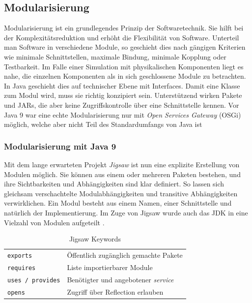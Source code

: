 \documentclass[a4paper,10.2pt,pdftex]{scrartcl}%
\begin{document}
\subsection{Modularisierung}
Modularisierung ist ein grundlegendes Prinzip der Softwaretechnik. Sie hilft bei der Komplexitätsreduktion und erhöht die Flexibilität von Software. Unterteil man Software in verschiedene Module, so geschieht dies nach gängigen Kriterien wie minimale Schnittstellen, maximale Bindung, minimale Kopplung oder Testbarkeit. Im Falle einer Simulation mit physikalischen Komponenten liegt es nahe, die einzelnen Komponenten als in sich geschlossene Module zu betrachten. In Java geschieht dies auf technischer Ebene mit Interfaces. Damit eine Klasse zum Modul wird, muss sie richtig konzipiert sein. Unterstützend wirken Pakete und JARs, die aber keine Zugriffskontrolle über eine Schnittstelle kennen. Vor Java 9 war eine echte Modularisierung nur mit \emph{Open Services Gateway} (OSGi) möglich, welche aber nicht Teil des Standardumfangs von Java ist \cite[S. 32f]{modul}

\subsubsection{Modularisierung mit Java 9} 
Mit dem lange erwarteten Projekt \emph{Jigsaw} ist nun eine explizite Erstellung von Modulen möglich. Sie können aus einem oder mehreren Paketen bestehen, und ihre Sichtbarkeiten und Abhängigkeiten sind klar definiert. So lassen sich gleichsam verschachtelte Modulabhängigkeiten und transitive Abhängigkeiten verwirklichen. Ein Modul besteht aus einem Namen, einer Schnittstelle und natürlich der Implementierung. Im Zuge von Jigsaw wurde auch das JDK in eine Vielzahl von Modulen aufgeteilt \cite[S. 863]{inden}. 

\begin{table}
\hspace{1cm}
\begin{tabular}{ll}
\texttt{exports} & Öffentlich zugänglich gemachte Pakete \\
\texttt{requires} & Liste importierbarer Module \\
\texttt{uses / provides} & Benötigter und angebotener \emph{service} \\
\texttt{opens} & Zugriff über Reflection erlauben
\end{tabular} 
\caption{Jigsaw Keywords}
\end{table}
\end{document}
